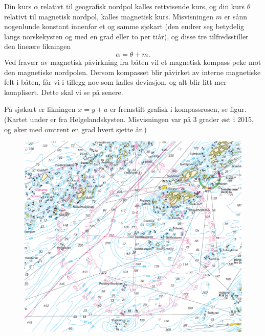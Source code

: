 Din kurs $\alpha$ relativt til geografisk nordpol kalles rettvisende kurs, 
og din kurs $\theta$ relativt til magnetisk nordpol, 
kalles magnetisk kurs. 
Misvisningen $m$ er sånn nogenlunde konstant innenfor et og samme sjøkart 
(den endrer seg betydelig langs norskekysten og med en grad eller to per tiår),
og disse tre tilfredsstiller den lineære likningen
\[
\alpha=\theta+m.
\]
Ved fravær av magnetisk påvirkning fra båten vil et magnetisk kompass peke mot den magnetiske nordpolen.
Dersom kompasset blir påvirket av interne magnetiske felt i båten,
får vi i tillegg noe som kalles deviasjon,
og alt blir litt mer komplisert.
Dette skal vi se på senere.

På sjøkart er likningen $x=y+a$ er fremstilt grafisk i kompassrosen, 
se figur. 
(Kartet under er fra Helgelandskysten.
Misvisningen var på 3 grader øst i 2015, 
og øker med omtrent en grad hvert sjette år.)
\begin{figure}
\includegraphics[scale=.67]{kompassrose}
\end{figure}



